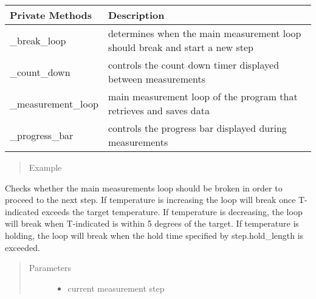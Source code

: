 \documentclass[letterpaper,10pt,english]{sphinxmanual}
\begin{document}
\begin{fulllineitems}
\begin{savenotes}\sphinxattablestart
\centering
\begin{tabulary}{\linewidth}[t]{|T|T|}
\hline
\sphinxstyletheadfamily 
Private Methods
&\sphinxstyletheadfamily 
Description
\\
\hline
\_break\_loop
&
determines when the main measurement loop should break and start a
new step
\\
\hline
\_count\_down
&
controls the count down timer displayed between measurements
\\
\hline
\_measurement\_loop
&
main measurement loop of the program that retrieves and saves
data
\\
\hline
\_progress\_bar
&
controls the progress bar displayed during measurements
\\
\hline
\end{tabulary}
\par
\sphinxattableend\end{savenotes}
\begin{quote}\begin{description}
\item[{Example}] \leavevmode
\end{description}\end{quote}

%
\begin{sphinxVerbatim}[commandchars=\\\{\}]
 
  
\end{sphinxVerbatim}

\begin{fulllineitems}
\label{\detokenize{laboratory:laboratory.Setup._break_loop}}
Checks whether the main measurements loop should be broken in order to proceed to the next step. If temperature is increasing the loop will break once T-indicated exceeds the target temperature. If temperature is decreasing, the loop will break when T-indicated is within 5 degrees of the target. If temperature is holding, the loop will break when the hold time specified by step.hold\_length is exceeded.
\begin{quote}\begin{description}
\item[{Parameters}] \leavevmode\begin{itemize}
\item {} 
 \textendash{} current measurement step


\end{itemize}
\end{description}
\end{quote}
\end{fulllineitems}
\end{fulllineitems}
\end{document}
